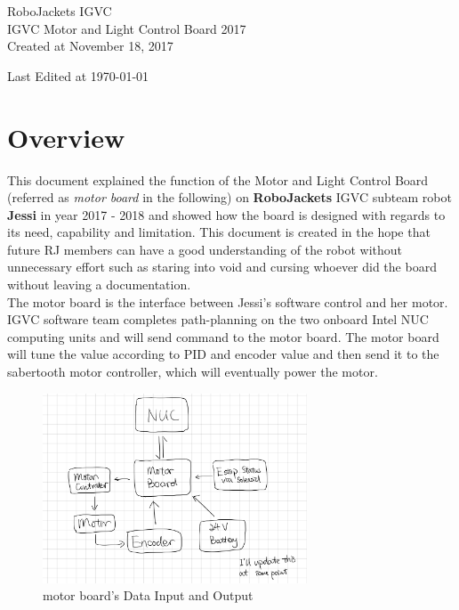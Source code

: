 \documentclass[letterpaper, 12pt]{article}
\begin{document}
\begin{titlepage}
\centering
	{\LARGE RoboJackets IGVC}\\
	\vspace{1cm}
	{\Large IGVC Motor and Light Control Board 2017}\\
	\vfill
	{\large Created at November 18, 2017}\\
	\vspace{1cm}
	{\large Last Edited at \today\par}
\end{titlepage}

\tableofcontents

\pagebreak

\section{Overview}
This document explained the function of the Motor and Light Control Board (referred as \emph{motor board} in the following) on \textbf{RoboJackets} IGVC subteam robot \textbf{Jessi} in year 2017 - 2018 and showed how the board is designed with regards to its need, capability and limitation. This document is created in the hope that future RJ members can have a good understanding of the robot without unnecessary effort such as staring into void and cursing whoever did the board without leaving a documentation. \vspace{6pt}\\
The motor board is the interface between Jessi's software control and her motor. IGVC software team completes path-planning on the two onboard Intel NUC computing units and will send command to the motor board. The motor board will  tune the value according to PID and encoder value and then send it to the sabertooth motor controller, which will eventually power the motor.\\
\begin{figure}[h]
\centering
\includegraphics[width=0.7\textwidth]{UpandLow.png}
\caption{motor board's Data Input and Output}
\end{figure}
\end{document}

